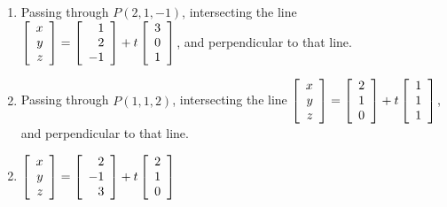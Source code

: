\begin{multicols}{2}
\begin{ex}
\begin{enumerate}[label={\alph*.}]
\item Passing through $P(2, 1, -1)$, intersecting the line 
$\left[
\begin{array}{r}
x\\
y\\
z
\end{array}
\right]
=
\left[
\begin{array}{r}
1\\
2\\
-1
\end{array}
\right]
+t
\left[
\begin{array}{r}
3\\
0\\
1
\end{array}
\right]$, and perpendicular to that line.

\item Passing through $P(1, 1, 2)$, intersecting the line 
$\left[
\begin{array}{r}
x\\
y\\
z
\end{array}
\right]
=
\left[
\begin{array}{r}
2\\
1\\
0
\end{array}
\right]
+t
\left[
\begin{array}{r}
1\\
1\\
1
\end{array}
\right]$, and perpendicular to that line.

\end{enumerate}
\begin{sol}
\begin{enumerate}[label={\alph*.}]
\setcounter{enumi}{1}
\item  
$\left[
\begin{array}{r}
x\\
y\\
z
\end{array}
\right]
=
\left[
\begin{array}{r}
2\\
-1\\
3
\end{array}
\right]
+t
\left[
\begin{array}{r}
2\\
1\\
0
\end{array}
\right]
$


\end{enumerate}
\end{sol}
\end{ex}
\end{multicols}

